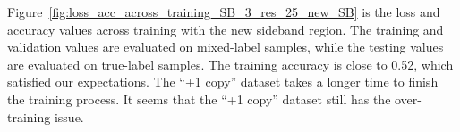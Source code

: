 \documentclass[12pt]{article}
\begin{document}
		Figure~\ref{fig:loss_acc_across_training_SB_3_res_25_new_SB} is the loss and accuracy values across training with the new sideband region. The training and validation values are evaluated on mixed-label samples, while the testing values are evaluated on true-label samples. The training accuracy is close to 0.52, which satisfied our expectations. The ``+1 copy'' dataset takes a longer time to finish the training process. It seems that the ``+1 copy'' dataset still has the over-training issue.
		\begin{figure}[htpb]
			\centering
			 \\
\end{figure}
\end{document}
